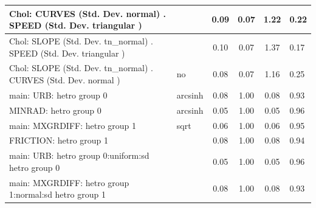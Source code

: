 \begin{table}
\begin{center}
\begin{tabular}{|l|l|c|c|c|l|}
			\hline
			 Chol: CURVES (Std. Dev. normal) . SPEED (Std. Dev.   triangular ) &  & 0.09 & 0.07 & 1.22 & 0.22 \\
			\hline
			 Chol: SLOPE (Std. Dev. tn_normal) . SPEED (Std. Dev.   triangular ) &  & 0.10 & 0.07 & 1.37 & 0.17 \\
			\hline
			 Chol: SLOPE (Std. Dev. tn_normal) . CURVES (Std. Dev.   normal ) & no & 0.08 & 0.07 & 1.16 & 0.25 \\
			\hline
			main: URB: hetro group 0 & arcsinh & 0.08 & 1.00 & 0.08 & 0.93 \\
			\hline
			MINRAD: hetro group 0 & arcsinh & 0.05 & 1.00 & 0.05 & 0.96 \\
			\hline
			main: MXGRDIFF: hetro group 1 & sqrt & 0.06 & 1.00 & 0.06 & 0.95 \\
			\hline
			FRICTION: hetro group 1 &  & 0.08 & 1.00 & 0.08 & 0.94 \\
			\hline
			main: URB: hetro group 0:uniform:sd  hetro group 0 &  & 0.05 & 1.00 & 0.05 & 0.96 \\
			\hline
			main: MXGRDIFF: hetro group 1:normal:sd  hetro group 1 &  & 0.08 & 1.00 & 0.08 & 0.93 \\
			\hline
		\end{tabular}
	\end{center}
\end{table}